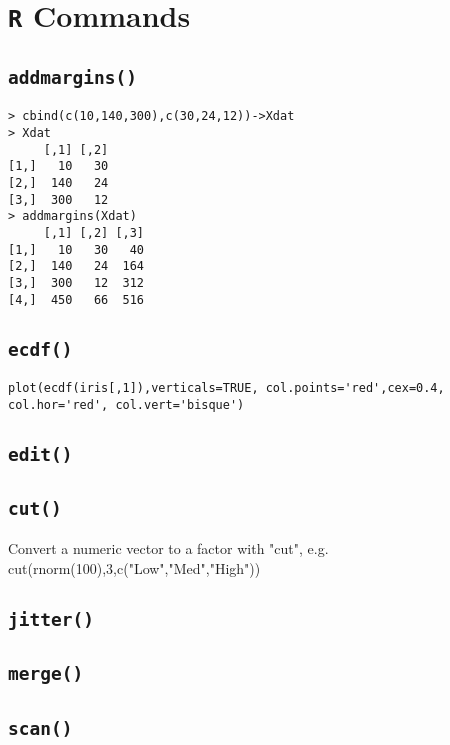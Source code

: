 \documentclass[a4paper,12pt]{article}
\begin{document}
\tableofcontents
\newpage
\section{\texttt{R} Commands}
\subsection{\texttt{addmargins()}}
\begin{framed}
\begin{verbatim}
> cbind(c(10,140,300),c(30,24,12))->Xdat
> Xdat
     [,1] [,2]
[1,]   10   30
[2,]  140   24
[3,]  300   12
> addmargins(Xdat)
     [,1] [,2] [,3]
[1,]   10   30   40
[2,]  140   24  164
[3,]  300   12  312
[4,]  450   66  516
\end{verbatim}
\end{framed}
\subsection{\texttt{ecdf()}}
\begin{framed}
\begin{verbatim}
plot(ecdf(iris[,1]),verticals=TRUE, col.points='red',cex=0.4, col.hor='red', col.vert='bisque')
\end{verbatim}
\end{framed}
\subsection{\texttt{edit()}}
\subsection{\texttt{cut()}}
Convert a numeric vector to a factor with "cut", e.g. 
cut(rnorm(100),3,c("Low","Med","High")) 

\subsection{\texttt{jitter()}}
\subsection{\texttt{merge()}}
\subsection{\texttt{scan()}}
\end{document}
